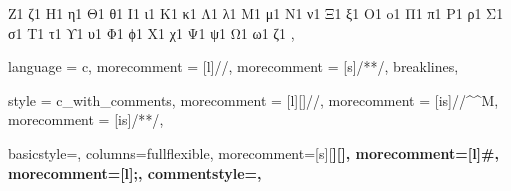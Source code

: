 {{	            {Z}{{\textZeta}}1    {ζ}{{\textzeta}}1%
	            {H}{{\textEta}}1     {η}{{\texteta}}1%
	            {Θ}{{\textTheta}}1   {θ}{{\texttheta}}1%
	            {I}{{\textIota}}1    {ι}{{\textiota}}1%
	            {K}{{\textKappa}}1   {κ}{{\textkappa}}1%
	            {Λ}{{\textLambda}}1  {λ}{{\textlambda}}1%
	            {M}{{\textMu}}1      {μ}{{\textmu}}1%
	            {N}{{\textNu}}1      {ν}{{\textnu}}1%
	            {Ξ}{{\textXi}}1      {ξ}{{\textxi}}1%
	            {O}{{\textOmikron}}1 {o}{{\textomikron}}1%
	            {Π}{{\textPi}}1      {π}{{\textpi}}1%
	            {P}{{\textRho}}1     {ρ}{{\textrho}}1%
	            {Σ}{{\textSigma}}1   {σ}{{\textsigma}}1%
	            {T}{{\textTau}}1     {τ}{{\texttau}}1%
	            {ϒ}{{\textUpsilon}}1 {υ}{{\textupsilon}}1%
	            {Φ}{{\textPhi}}1     {ϕ}{{\textphi}}1%
	            {X}{{\textChi}}1     {χ}{{\textchi}}1%
	            {Ψ}{{\textPsi}}1     {ψ}{{\textpsi}}1%
	            {Ω}{{\textOmega}}1   {ω}{{\textomega}}1%
	            {ζ}{{\varsigma}}1%
	         },
}

%
{
	language     = c,
	morecomment  = [l]{//},
	morecomment  = [s]{/*}{*/},
	breaklines,
}

%
{
	style        = c_with_comments,
	morecomment  = [l][\nullfont]{//},
	morecomment  = [is]{//}{\^^M},
	morecomment  = [is]{/*}{*/},
}

{
	basicstyle=\ttfamily\small,
	columns=fullflexible,
	morecomment=[s][\color{Orchid}\bfseries]{[}{]},
	morecomment=[l]{\#},
	morecomment=[l]{;},
	commentstyle=\color{gray}\ttfamily,
}






